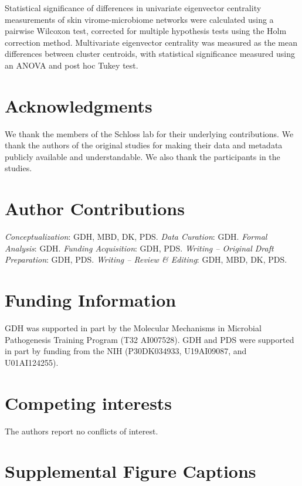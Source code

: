\documentclass[12pt,]{article}
\begin{document}
Statistical significance of differences in univariate eigenvector
centrality measurements of skin virome-microbiome networks were
calculated using a pairwise Wilcoxon test, corrected for multiple
hypothesis tests using the Holm correction method. Multivariate
eigenvector centrality was measured as the mean differences between
cluster centroids, with statistical significance measured using an ANOVA
and post hoc Tukey test.

\section{Acknowledgments}\label{acknowledgments}

We thank the members of the Schloss lab for their underlying
contributions. We thank the authors of the original studies for making
their data and metadata publicly available and understandable. We also
thank the participants in the studies.

\section{Author Contributions}\label{author-contributions}

\emph{Conceptualization}: GDH, MBD, DK, PDS. \emph{Data Curation}: GDH.
\emph{Formal Analysis}: GDH. \emph{Funding Acquisition}: GDH, PDS.
\emph{Writing -- Original Draft Preparation}: GDH, PDS. \emph{Writing --
Review \& Editing}: GDH, MBD, DK, PDS.

\section{Funding Information}\label{funding-information}

GDH was supported in part by the Molecular Mechanisms in Microbial
Pathogenesis Training Program (T32 AI007528). GDH and PDS were supported
in part by funding from the NIH (P30DK034933, U19AI09087, and
U01AI124255).

\section{Competing interests}\label{competing-interests}

The authors report no conflicts of interest.

\newpage

\section{Supplemental Figure
Captions}\label{supplemental-figure-captions}
\end{document}
